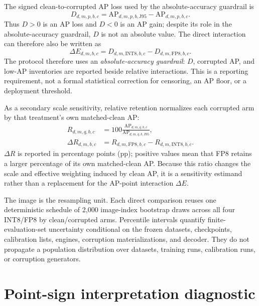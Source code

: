 \documentclass[10pt]{article}
\newcommand{\AP}{\mathrm{AP}}
\newcommand{\Jclean}{\mathrm{J95}}
\newcommand{\DeltaE}{\Delta E}
\newcommand{\DeltaR}{\Delta R}
\begin{document}
The signed clean-to-corrupted AP loss used by the absolute-accuracy guardrail is
\begin{equation}
D_{d,m,p,b,c}=\AP_{d,m,p,b,\Jclean}-\AP_{d,m,p,b,c}.
\end{equation}
Thus $D>0$ is an AP loss and $D<0$ is an AP gain; despite its role in the
absolute-accuracy guardrail, $D$ is not an absolute value.
The direct interaction can therefore also be written as
\begin{equation}
\Delta E_{d,m,b,c}=D_{d,m,\mathrm{INT8},b,c}-D_{d,m,\mathrm{FP8},b,c}.
\end{equation}
The protocol therefore uses an \emph{absolute-accuracy guardrail}: $D$, corrupted AP, and low-AP
inventories are reported beside relative interactions. This is a reporting requirement, not a formal
statistical correction for censoring, an AP floor, or a deployment threshold.

As a secondary scale sensitivity, relative retention normalizes each corrupted
arm by that treatment's own matched-clean AP:
\begin{align}
R_{d,m,q,b,c}
 &=100\frac{\AP_{d,m,q,b,c}}{\AP_{d,m,q,b,\Jclean}},\\
\DeltaR_{d,m,b,c}
 &=R_{d,m,\mathrm{FP8},b,c}-R_{d,m,\mathrm{INT8},b,c}.
\end{align}
$\DeltaR$ is reported in percentage points (pp); positive values mean that FP8
retains a larger percentage of its own matched-clean AP. Because this ratio
changes the scale and effective weighting induced by clean AP, it is a
sensitivity estimand rather than a replacement for the AP-point interaction
$\DeltaE$.

The image is the resampling unit. Each direct comparison reuses one deterministic
schedule of 2,000 image-index bootstrap draws across all four INT8/FP8 by
clean/corrupted arms. Percentile intervals quantify finite-evaluation-set
uncertainty conditional on the frozen datasets, checkpoints, calibration lists,
engines, corruption materializations, and decoder. They do not propagate a
population distribution over datasets, training runs, calibration runs, or
corruption generators.

\section{Point-sign interpretation diagnostic}
\end{document}
